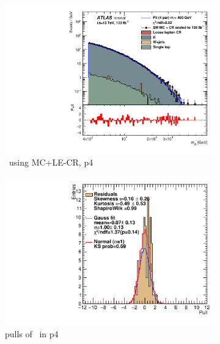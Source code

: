 \newpage

\begin{figure}[ht]
    \centering
    \begin{subfigure}[h]{0.38\linewidth}
    \includegraphics[scale=0.3]{figs/ch6/fit/variable_nosmooth/p4/1PB/output_SMMCplusCR_Mjb_p4.pdf}%
    \caption{\mjb \ using MC+LE-CR, p4}
    \end{subfigure}
    \hfill
    \begin{subfigure}[h]{0.4\linewidth}
    \includegraphics[scale=0.32]{figs/ch6/fit/variable_nosmooth/p4/1PB/pull_SMMCplusCR_Mjb_p4.pdf}%
    \caption{pulls of \mjb \ in p4}
    \end{subfigure}
    \hfill
    \begin{subfigure}[h]{0.38\linewidth}

\end{subfigure}
\end{figure}
